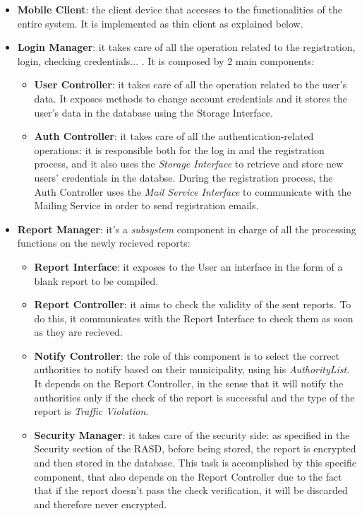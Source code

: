 \documentclass{report}
\begin{document}
\begin{itemize}
\item \textbf{Mobile Client}: the client device that accesses to the functionalities of the entire system. It is implemented as thin client as explained below.
\item \textbf{Login Manager}: it takes care of all the operation related to the registration, login, checking credentials... . It is composed by 2 main components:
\begin{itemize}
    \item \textbf{User Controller}: it takes care of all the operation related to the user's data. It exposes methods to change account credentials and it stores the user's data in the database using the Storage Interface.
\item \textbf{Auth Controller}: it takes care of all the authentication-related operations: it is responsible both for the log in and the registration process, and it also uses the \textit{Storage Interface} to retrieve and store new users' credentials in the databse. During the registration process, the Auth Controller uses the \textit{Mail Service Interface} to communicate with the Mailing Service in order to send registration emails.
\end{itemize}
\item \textbf{Report Manager}: it's a \textit{subsystem} component in charge of all the processing functions on the newly recieved reports:
\begin{itemize}
    \item \textbf{Report Interface}: it exposes to the User an interface in the form of a blank report to be compiled.
    \item \textbf{Report Controller}: it aims to check the validity of the sent reports. To do this, it communicates with the Report Interface to check them as soon as they are recieved.
    \item \textbf{Notify Controller}: the role of this component is to select the correct authorities to notify based on their municipality, using his \textit{AuthorityList}. It depends on the Report Controller, in the sense that it will notify the authorities only if the check of the report is successful and the type of the report is \textit{Traffic Violation}.
    \item \textbf{Security Manager}: it takes care of the security side: as specified in the Security section of the RASD, before being stored, the report is encrypted and then stored in the database. This task is accomplished by this specific component, that also depends on the Report Controller due to the fact that if the report doesn't pass the check verification, it will be discarded and therefore never encrypted.

\end{itemize}
\end{itemize}
\end{document}
